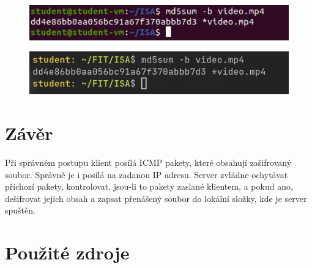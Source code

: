 \documentclass[11pt, a4paper]{article}
\begin{document}
\begin{flushleft}
 \begin{figure}[H]
    \centering
    \includegraphics[scale=0.98, keepaspectratio]{img/ub_cmp_vid.png}
    \label{fig:txt}
 \end{figure}
 
  \begin{figure}[H]
    \centering
    \includegraphics[scale=0.92, keepaspectratio]{img/ub_cmp_vid1.png}
    \label{fig:txt}
 \end{figure}

\end{flushleft}
\section{Závěr}
Při správném postupu klient posílá ICMP pakety, které obsahují zašifrovaný soubor. Správně je i posílá na zadanou IP adresu. Server zvládne ochytávat příchozí pakety, kontrolovat, jsou-li to pakety zaslané klientem, a pokud ano, dešifrovat jejich obsah a zapsat přenášený soubor do lokální složky, kde je server spuštěn.

\newpage

\section{Použité zdroje}
\nocite{*}
\renewcommand{\section}[2]{}



    
\end{document}
